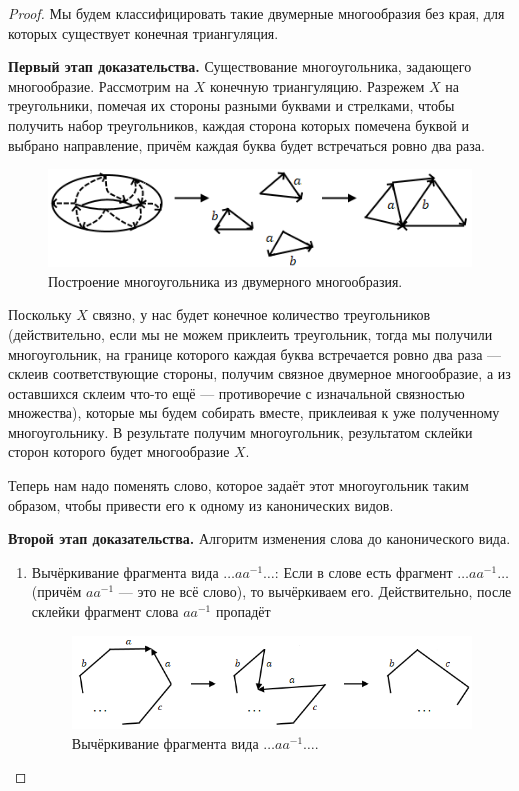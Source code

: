 \begin{proof}
    Мы будем классифицировать такие двумерные многообразия без края, для которых существует конечная триангуляция.
    
    \textbf{Первый этап доказательства.} Существование многоугольника, задающего многообразие.
    Рассмотрим на $X$ конечную триангуляцию. Разрежем $X$ на треугольники, помечая их стороны разными буквами и стрелками, чтобы получить набор треугольников, каждая сторона которых помечена буквой и выбрано направление, причём каждая буква будет встречаться ровно два раза.

    \begin{figure}[htbp]
        \centering
        \includegraphics[scale=1]{images/c10.3.png}
        \caption{Построение многоугольника из двумерного многообразия.}
        \label{fig:c10.3}
    \end{figure}

    Поскольку $X$ связно, у нас будет конечное количество треугольников (действительно, если мы не можем приклеить треугольник, тогда мы получили многоугольник, на границе которого каждая буква встречается ровно два раза — склеив соответствующие стороны, получим связное двумерное многообразие, а из оставшихся склеим что-то ещё — противоречие с изначальной связностью множества), которые мы будем собирать вместе, приклеивая к уже полученному многоугольнику. В результате получим многоугольник, результатом склейки сторон которого будет многообразие $X$.

    Теперь нам надо поменять слово, которое задаёт этот многоугольник таким образом, чтобы привести его к одному из канонических видов.

    \textbf{Второй этап доказательства.} Алгоритм изменения слова до канонического вида.
    \begin{enumerate}
        \item Вычёркивание фрагмента вида $\dots a a^{-1} \dots$:
        Если в слове есть фрагмент $\dots a a^{-1} \dots$ (причём $a a^{-1}$ — это не всё слово), то вычёркиваем его. Действительно, после склейки фрагмент слова $aa^{-1}$ пропадёт 

        \begin{figure}[htbp]
            \centering
            \includegraphics[scale=0.7]{images/c10.4.png}
            \caption{Вычёркивание фрагмента вида $\dots a a^{-1} \dots$.}
            \label{fig:c10.4}
        \end{figure}


\end{enumerate}
\end{proof}

